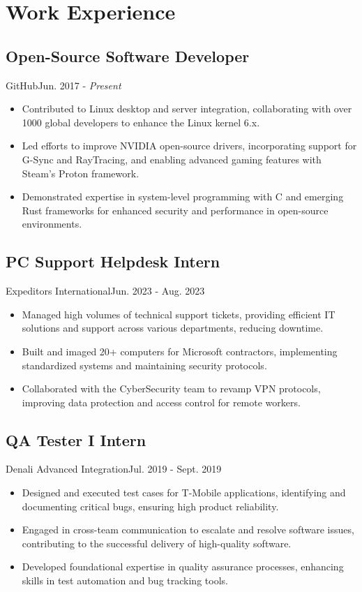 \section{Work Experience}
\subsection{Open-Source Software Developer}{GitHub}{Jun. 2017 - \textit{Present}}
\begin{itemize}
    \item Contributed to Linux desktop and server integration, collaborating with over 1000 global developers to enhance the Linux kernel 6.x.
    \item Led efforts to improve NVIDIA open-source drivers, incorporating support for G-Sync and RayTracing, and enabling advanced gaming features with Steam’s Proton framework.
    \item Demonstrated expertise in system-level programming with C and emerging Rust frameworks for enhanced security and performance in open-source environments.
\end{itemize}

\subsection{PC Support Helpdesk Intern}{Expeditors International}{Jun. 2023 - Aug. 2023}
\begin{itemize}
    \item Managed high volumes of technical support tickets, providing efficient IT solutions and support across various departments, reducing downtime.
    \item Built and imaged 20+ computers for Microsoft contractors, implementing standardized systems and maintaining security protocols.
    \item Collaborated with the CyberSecurity team to revamp VPN protocols, improving data protection and access control for remote workers.
\end{itemize}

\subsection{QA Tester I Intern}{Denali Advanced Integration}{Jul. 2019 - Sept. 2019}
\begin{itemize}
    \item Designed and executed test cases for T-Mobile applications, identifying and documenting critical bugs, ensuring high product reliability.
    \item Engaged in cross-team communication to escalate and resolve software issues, contributing to the successful delivery of high-quality software.
    \item Developed foundational expertise in quality assurance processes, enhancing skills in test automation and bug tracking tools.
\end{itemize}